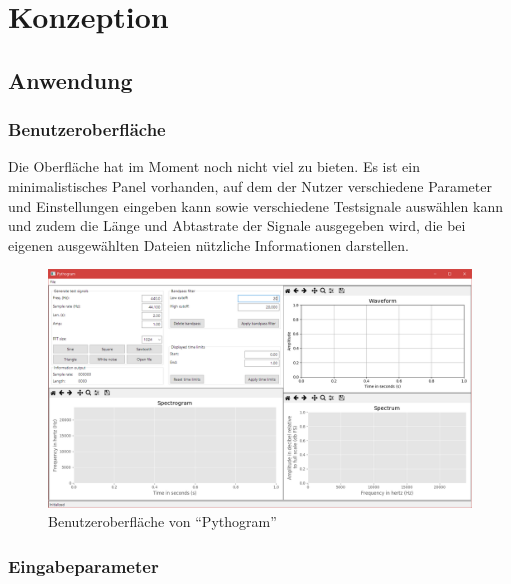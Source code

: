 \documentclass[a4paper]{article}
\begin{document}
\section{Konzeption}

\subsection{Anwendung}

\subsubsection{Benutzeroberfläche}

Die Oberfläche hat im Moment noch nicht viel zu bieten. Es ist ein minimalistisches Panel vorhanden, auf dem der Nutzer verschiedene Parameter und Einstellungen eingeben kann sowie verschiedene Testsignale auswählen kann und zudem die Länge und Abtastrate der Signale ausgegeben wird, die bei eigenen ausgewählten Dateien nützliche Informationen darstellen.
\vspace{2em}
\begin{figure}[H]
    \centering
    \begin{minipage}{1.0\textwidth}
        \centering
        \includegraphics[width=1.0\textwidth]{GUI.png}
        \caption{Benutzeroberfläche von "`Pythogram"'}
    \end{minipage}
\end{figure}

\subsubsection{Eingabeparameter}
\end{document}

